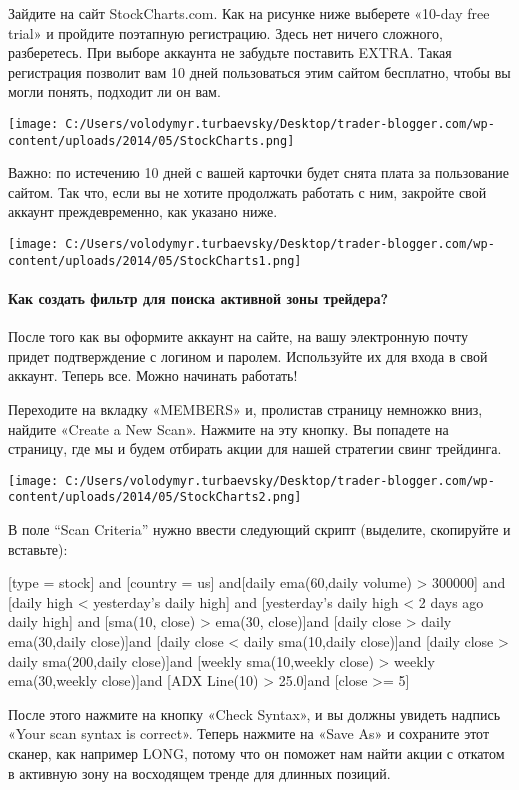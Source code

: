 \documentclass[a5paper]{article}
\begin{document}
Зайдите на сайт StockCharts.com. Как на рисунке ниже выберете «10-day
free trial» и пройдите поэтапную регистрацию. Здесь нет ничего
сложного, разберетесь. При выборе аккаунта не забудьте поставить
EXTRA. Такая регистрация позволит вам 10 дней пользоваться этим сайтом
бесплатно, чтобы вы могли понять, подходит ли он вам.

\texttt{[image: C:/Users/volodymyr.turbaevsky/Desktop/trader-blogger.com/wp-content/uploads/2014/05/StockCharts.png]}

Важно: по истечению 10 дней с вашей карточки будет снята плата за
пользование сайтом. Так что, если вы не хотите продолжать работать с
ним, закройте свой аккаунт преждевременно, как указано ниже.

\texttt{[image: C:/Users/volodymyr.turbaevsky/Desktop/trader-blogger.com/wp-content/uploads/2014/05/StockCharts1.png]}

\paragraph{Как создать фильтр для поиска активной зоны трейдера?}

После того как вы оформите аккаунт на сайте, на вашу электронную почту придет подтверждение с логином и паролем. Используйте их для входа в свой аккаунт. Теперь все. Можно начинать работать!

Переходите на вкладку «MEMBERS» и, пролистав страницу немножко вниз, найдите «Create a New Scan». Нажмите на эту кнопку. Вы попадете на страницу, где мы и будем отбирать акции для нашей стратегии свинг трейдинга.

\texttt{[image: C:/Users/volodymyr.turbaevsky/Desktop/trader-blogger.com/wp-content/uploads/2014/05/StockCharts2.png]}

В поле “Scan Criteria” нужно ввести следующий скрипт (выделите, скопируйте и вставьте):

[type = stock] and [country = us] and[daily ema(60,daily volume) > 300000] and
[daily high < yesterday's daily high] and
[yesterday's daily high < 2 days ago daily high] and
[sma(10, close) > ema(30, close)]and
[daily close > daily ema(30,daily close)]and
[daily close < daily sma(10,daily close)]and
[daily close > daily sma(200,daily close)]and
[weekly sma(10,weekly close) > weekly ema(30,weekly close)]and
[ADX Line(10) > 25.0]and
[close >= 5]

После этого нажмите на кнопку «Check Syntax», и вы должны увидеть надпись «Your scan syntax is correct». Теперь нажмите на «Save As» и сохраните этот сканер, как например LONG, потому что он поможет нам найти акции с откатом в активную зону на восходящем тренде для длинных позиций.
\end{document}
